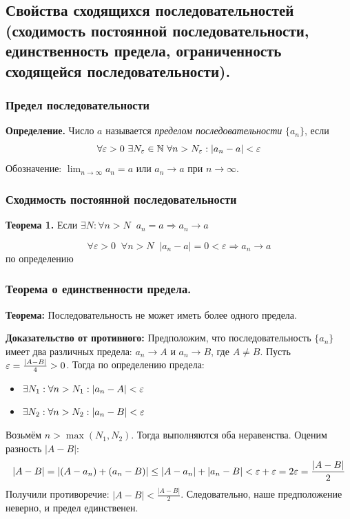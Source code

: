 \subsection{Свойства сходящихся последовательностей (сходимость постоянной последовательности, единственность предела, ограниченность сходящейся последовательности).}
  
\subsubsection*{Предел последовательности}
\begin{tcolorbox}
\textbf{Определение.} Число $a$ называется \textit{пределом последовательности} $\{a_n\}$, если
$$\forall \varepsilon > 0\ \exists N_\varepsilon \in \mathbb{N}\ \forall n > N_\varepsilon: |a_n - a| < \varepsilon$$
Обозначение: $\lim_{n\to\infty} a_n = a$ или $a_n \to a$ при $n \to \infty$.
\end{tcolorbox}

\subsubsection*{Сходимость постоянной последовательности}
\begin{tcolorbox}
    \textbf{Теорема 1.} Если $\exists N: \forall n > N \;\; a_n = a \Rightarrow a_n\to a$
\end{tcolorbox}
\begin{tcolorbox}[title=Доказательство]
    \[ \forall \varepsilon>0 \;\;\forall n>N \;\; |a_n - a| = 0 < \varepsilon \Rightarrow a_n\to a\] по определению 
\end{tcolorbox}

\subsubsection*{Теорема о единственности предела.}
\textbf{Теорема:} Последовательность не может иметь более одного предела.

\begin{tcolorbox}[title=Доказательство теоремы, breakable]
\textbf{Доказательство от противного:}
Предположим, что последовательность $\{a_n\}$ имеет два различных предела: $a_n \to A$ и $a_n \to B$, где $A \neq B$.
Пусть $\varepsilon = \frac{|A - B|}{4} > 0$. Тогда по определению предела:
\begin{itemize}
    \item $\exists N_1: \forall n > N_1: |a_n - A| < \varepsilon$
    \item $\exists N_2: \forall n > N_2: |a_n - B| < \varepsilon$
\end{itemize}
Возьмём $n > \max(N_1, N_2)$. Тогда выполняются оба неравенства. Оценим разность $|A - B|$:
$$|A - B| = |(A - a_n) + (a_n - B)| \leq |A - a_n| + |a_n - B| < \varepsilon + \varepsilon = 2\varepsilon = \frac{|A - B|}{2}$$
Получили противоречие: $|A - B| < \frac{|A - B|}{2}$. Следовательно, наше предположение неверно, и предел единственен.
\end{tcolorbox}


